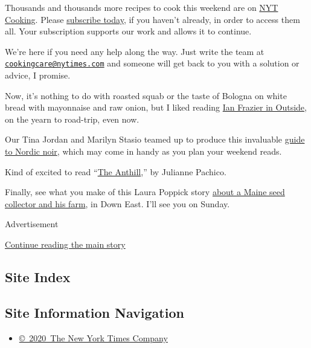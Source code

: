 Thousands and thousands more recipes to cook this weekend are on
\href{https://cooking.nytimes.com/}{NYT Cooking}. Please
\href{https://www.nytimes.com/subscription/cooking.html?campaignId=6XQHR}{subscribe
today}, if you haven't already, in order to access them all. Your
subscription supports our work and allows it to continue.

We're here if you need any help along the way. Just write the team at
\href{mailto:cookingcare@nytimes.com}{\nolinkurl{cookingcare@nytimes.com}}
and someone will get back to you with a solution or advice, I promise.

Now, it's nothing to do with roasted squab or the taste of Bologna on
white bread with mayonnaise and raw onion, but I liked reading
\href{https://www.outsideonline.com/2415424/comfort-in-motion-traveling}{Ian
Frazier in Outside}, on the yearn to road-trip, even now.

Our Tina Jordan and Marilyn Stasio teamed up to produce this invaluable
\href{https://www.nytimes.com/2020/07/24/books/review/nordic-noir-guide.html}{guide
to Nordic noir}, which may come in handy as you plan your weekend reads.

Kind of excited to read
``\href{https://www.penguinrandomhouse.com/books/622669/the-anthill-by-julianne-pachico/}{The
Anthill},'' by Julianne Pachico.

Finally, see what you make of this Laura Poppick story
\href{https://downeast.com/land-wildlife/rare-heirloom-seeds/}{about a
Maine seed collector and his farm}, in Down East. I'll see you on
Sunday.

Advertisement

\protect\hyperlink{after-bottom}{Continue reading the main story}

\hypertarget{site-index}{%
\subsection{Site Index}\label{site-index}}

\hypertarget{site-information-navigation}{%
\subsection{Site Information
Navigation}\label{site-information-navigation}}

\begin{itemize}
\tightlist
\item
  \href{https://help.nytimes.com/hc/en-us/articles/115014792127-Copyright-notice}{©~2020~The
  New York Times Company}
\end{itemize}

